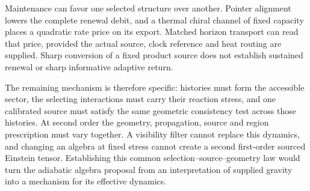 Maintenance can favor one selected structure over another.
Pointer alignment lowers the complete renewal debit, and a thermal
chiral channel of fixed capacity places a quadratic rate price on
its export. Matched horizon transport can read that price, provided
the actual source, clock reference and heat routing are supplied.
Sharp conversion of a fixed product source does not establish
sustained renewal or sharp informative adaptive return.

The remaining mechanism is therefore specific: histories must form
the accessible sector, the selecting interactions must carry their
reaction stress, and one calibrated source must satisfy the same
geometric consistency test across those histories. At second order
the geometry, propagation, source and region prescription must vary
together. A visibility filter cannot replace this dynamics, and
changing an algebra at fixed stress cannot create a second
first-order sourced Einstein tensor. Establishing this common
selection--source--geometry law would turn the adiabatic algebra
proposal from an interpretation of supplied gravity into a mechanism
for its effective dynamics.

